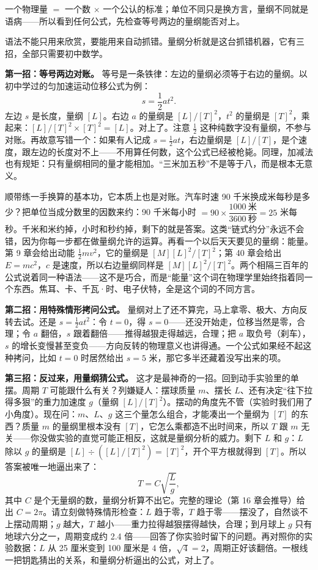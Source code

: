 
\begin{oneline}
一个物理量 $=$ 一个数 $\times$ 一个公认的标准；单位不同只是换方言，量纲不同就是语病——所以看到任何公式，先检查等号两边的量纲能否对上。
\end{oneline}


语法不能只用来欣赏，要能用来自动抓错。量纲分析就是这台抓错机器，它有三招，全部只需要初中数学。

\textbf{第一招：等号两边对账。} 等号是一条铁律：左边的量纲必须等于右边的量纲。以初中学过的匀加速运动位移公式为例：
\[
s = \frac{1}{2} a t^2 .
\]
左边 $s$ 是长度，量纲 $[L]$。右边 $a$ 的量纲是 $[L]/[T]^2$，$t^2$ 的量纲是 $[T]^2$，乘起来：$[L]/[T]^2 \times [T]^2 = [L]$。对上了。注意 $\frac{1}{2}$ 这种纯数字没有量纲，不参与对账。再故意写错一个：如果有人记成 $s = \frac{1}{2} a t$，右边量纲是 $[L]/[T]$，是个速度，跟左边的长度对不上——不用算任何数，这个公式已经被枪毙。同理，加减法也有规矩：只有量纲相同的量才能相加。“三米加五秒”不是等于八，而是根本无意义。

顺带练一手换算的基本功，它本质上也是对账。汽车时速 90 千米换成米每秒是多少？把单位当成分数里的因数来约：90 千米每小时 $= 90 \times \dfrac{1000\ \text{米}}{3600\ \text{秒}} = 25$ 米每秒。千米和米约掉，小时和秒约掉，剩下的就是答案。这类“链式约分”永远不会错，因为你每一步都在做量纲允许的运算。再看一个以后天天要见的量纲：能量。第 9 章会给出动能 $\frac{1}{2}mv^2$，它的量纲是 $[M][L]^2/[T]^2$；第 40 章会给出 $E = mc^2$，$c$ 是速度，所以右边量纲同样是 $[M][L]^2/[T]^2$。两个相隔三百年的公式说着同一种语法——这不是巧合，而是“能量”这个词在物理学里始终指着同一个东西。焦耳、卡、千瓦·时、电子伏特，全是这个词的不同方言。

\textbf{第二招：用特殊情形拷问公式。} 量纲对上了还不算完，马上拿零、极大、方向反转去试。还是 $s = \frac{1}{2} a t^2$：令 $t = 0$，得 $s = 0$——还没开始走，位移当然是零，合理；令 $a$ 翻倍，$s$ 跟着翻倍——推得越狠走得越远，合理；把 $a$ 取负号（刹车），$s$ 的增长变慢甚至变负——方向反转的物理意义也讲得通。一个公式如果经不起这种拷问，比如 $t = 0$ 时居然给出 $s = 5$ 米，那它多半还藏着没写出来的项。

\textbf{第三招：反过来，用量纲猜公式。} 这才是最神奇的一招。回到动手实验里的单摆。周期 $T$ 可能跟什么有关？列嫌疑人：摆球质量 $m$、摆长 $L$、还有决定“往下拉得多狠”的重力加速度 $g$（量纲 $[L]/[T]^2$）。摆动的角度先不管（实验时我们用了小角度）。现在问：$m$、$L$、$g$ 这三个量怎么组合，才能凑出一个量纲为 $[T]$ 的东西？质量 $m$ 的量纲里根本没有 $[T]$，它怎么乘都造不出时间来，所以 $T$ 跟 $m$ 无关——你没做实验的直觉可能正相反，这就是量纲分析的威力。剩下 $L$ 和 $g$：$L$ 除以 $g$ 的量纲是 $[L] \div ([L]/[T]^2) = [T]^2$，开个平方根就得到 $[T]$。所以答案被唯一地逼出来了：
\[
T = C\sqrt{\frac{L}{g}},
\]
其中 $C$ 是个无量纲的数，量纲分析算不出它。完整的理论（第 16 章会推导）给出 $C = 2\pi$。请立刻做特殊情形检查：$L$ 趋于零，$T$ 趋于零——摆没了，自然谈不上摆动周期；$g$ 越大，$T$ 越小——重力拉得越狠摆得越快，合理；到月球上 $g$ 只有地球六分之一，周期变成约 2.4 倍——回答了你实验时留下的问题。再对照你的实验数据：$L$ 从 25 厘米变到 100 厘米是 4 倍，$\sqrt{4} = 2$，周期正好该翻倍。一根线一把钥匙猜出的关系，和量纲分析逼出的公式，对上了。

